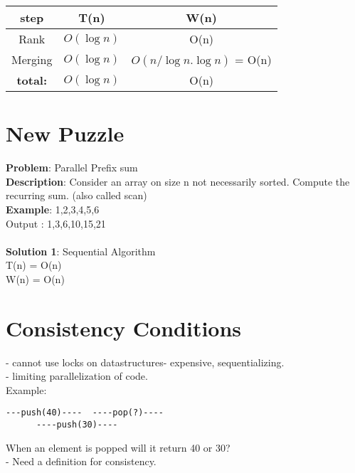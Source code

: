 \documentclass[twoside]{article}
\begin{document}
\begin{table}[ht]
\begin{tabular} {c c c}
step & T(n) & W(n) \\
\hline
Rank & $O(\log n)$ & O(n) \\
Merging & $O(\log n)$ &$O(n / \log n . \log n)$ = O(n)\\
\textbf{total:} & $O(\log n)$ & O(n) \\
\hline
\end{tabular}
\end{table}

\section{New Puzzle}

\textbf{Problem}: Parallel Prefix sum\\
\textbf{Description}: Consider an array on size n not necessarily sorted. Compute the recurring sum. (also called scan)\\
\textbf{Example}: 1,2,3,4,5,6 \\ 
Output : 1,3,6,10,15,21\\
\\

\textbf{Solution 1}: Sequential Algorithm \\
T(n) = O(n) \\
W(n) = O(n) \\
  
\section{Consistency Conditions}
- cannot use locks on datastructures- expensive, sequentializing.\\
- limiting parallelization of code. \\
Example: 
\begin{verbatim}
---push(40)----  ----pop(?)----
      ----push(30)----
\end{verbatim}
When an element is popped will it return 40 or 30? \\ 
- Need a definition for consistency.
\end{document}
